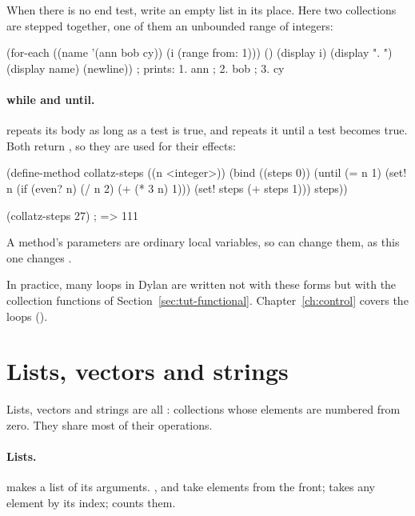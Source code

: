 When there is no end test, write an empty list in its place. Here two
collections are stepped together, one of them an unbounded range of
integers:

\begin{dylan}
(for-each ((name '(ann bob cy))
           (i (range from: 1)))
          ()
  (display i) (display ". ") (display name) (newline))
; prints: 1. ann
;         2. bob
;         3. cy
\end{dylan}

\paragraph{while and until.}
 repeats its body as long as a test is true, and 
repeats it until a test becomes true. Both return , so they are
used for their effects:

\begin{dylan}
(define-method collatz-steps ((n <integer>))
  (bind ((steps 0))
    (until (= n 1)
      (set! n (if (even? n) (/ n 2) (+ (* 3 n) 1)))
      (set! steps (+ steps 1)))
    steps))

(collatz-steps 27)              ; => 111
\end{dylan}

A method's parameters are ordinary local variables, so  can
change them, as this one changes .

In practice, many loops in Dylan are written not with these forms but
with the collection functions of Section~\ref{sec:tut-functional}.
Chapter~\ref{ch:control} covers the loops ().

\section{Lists, vectors and strings}\label{sec:tut-sequences}

Lists, vectors and strings are all : collections whose
elements are numbered from zero. They share most of their operations.

\paragraph{Lists.}
 makes a list of its arguments. , 
and  take elements from the front;  takes any
element by its index;  counts them.

